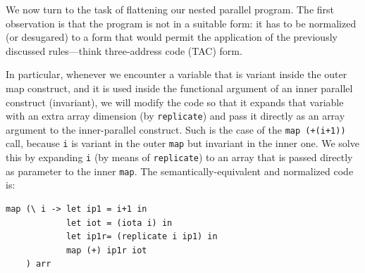 \documentclass[acmsmall,review]{acmart}\settopmatter{printfolios=true,printccs=false,printacmref=false}
\begin{document}
We now turn to the task of flattening our nested parallel program.
The first observation is that the program is not in a suitable form:
it has to be normalized (or desugared) to a form that would permit 
the application of the previously discussed rules---think three-address
code (TAC) form.

In particular, whenever we encounter a variable that is variant inside
the outer map construct, and it is used inside the functional argument
of an inner parallel construct (invariant), we will modify the code so 
that it expands that variable with an extra array dimension 
(by \lstinline{replicate}) and pass it directly as an array argument
to the inner-parallel construct. Such is the case of the {\tt map (+(i+1))} 
call, because {\tt i} is variant in the outer \lstinline{map} but
invariant in the inner one. We solve this by expanding {\tt i} 
(by means of \lstinline{replicate}) to an array that 
is passed directly as parameter to the inner \lstinline{map}.
The semantically-equivalent and normalized code is:
\begin{lstlisting}[mathescape=true]
map (\ i -> let ip1 = i+1 in
            let iot = (iota i) in
            let ip1r= (replicate i ip1) in
            map (+) ip1r iot
    ) arr
\end{lstlisting}\vspace{-2ex}
  
\end{document}
